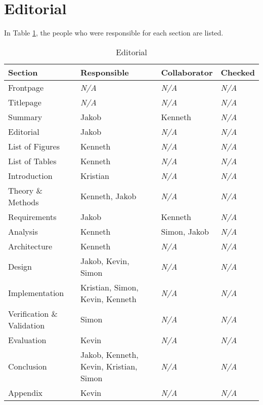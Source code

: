 \section{Editorial}
In Table \ref{table:editorial}, the people who were responsible for each section
are listed.
\begin{table}[ht]
    \begin{tabularx}{\textwidth}{|>{\RaggedRight}X|>{\RaggedRight}X|>{\RaggedRight}X|>{\RaggedRight}X|}
        \hline
        \textbf{Section} & \textbf{Responsible} & \textbf{Collaborator} & \textbf{Checked}\\
        \hline
        Frontpage & \textit{N/A} & \textit{N/A} & \textit{N/A}\\
        \hline
        Titlepage & \textit{N/A} & \textit{N/A} & \textit{N/A}\\
        \hline
        Summary & Jakob & Kenneth & \textit{N/A}\\
        \hline
        Editorial & Jakob & \textit{N/A} & \textit{N/A}\\
        \hline
        List of Figures & Kenneth & \textit{N/A} & \textit{N/A}\\
        \hline
        List of Tables & Kenneth & \textit{N/A} & \textit{N/A}\\
        \hline
        Introduction & Kristian & \textit{N/A} & \textit{N/A}\\
        \hline
        Theory \& Methods & Kenneth, Jakob & \textit{N/A} & \textit{N/A}\\
        \hline
        Requirements & Jakob & Kenneth & \textit{N/A}\\
        \hline
        Analysis & Kenneth & Simon, Jakob & \textit{N/A}\\
        \hline
        Architecture & Kenneth & \textit{N/A} & \textit{N/A}\\
        \hline
        Design & Jakob, Kevin, Simon & \textit{N/A} & \textit{N/A}\\
        \hline
        Implementation & Kristian, Simon, Kevin, Kenneth & \textit{N/A} & \textit{N/A}\\
        \hline
        Verification \& Validation & Simon & \textit{N/A} & \textit{N/A}\\
        \hline
        Evaluation & Kevin & \textit{N/A} & \textit{N/A}\\
        \hline
        Conclusion & Jakob, Kenneth, Kevin, Kristian, Simon & \textit{N/A} & \textit{N/A}\\
        \hline
        Appendix & Kevin & \textit{N/A} & \textit{N/A}\\
        \hline
    \end{tabularx}
    \caption{Editorial} 
    \label{table:editorial}
\end{table} 